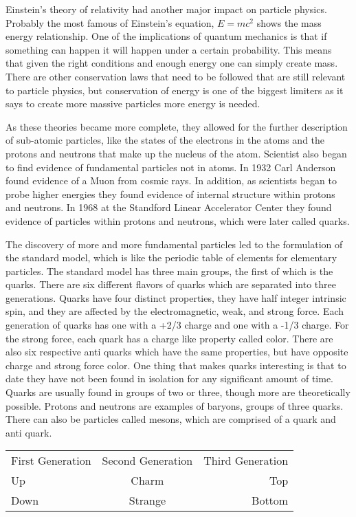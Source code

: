 \documentclass
[]
{thesis}
\begin{document}
Einstein's theory of relativity had another major impact on particle physics. Probably the most famous of Einstein's equation, $E = mc^2$ shows the mass energy relationship. One of the implications of quantum mechanics is that if something can happen it will happen under a certain probability. This means that given the right conditions and enough energy one can simply create mass. There are other conservation laws that need to be followed that are still relevant to particle physics, but conservation of energy is one of the biggest limiters as it says to create more massive particles more energy is needed. 

As these theories became more complete, they allowed for the further description of sub-atomic particles, like the states of the electrons in the atoms and the protons and neutrons that make up the nucleus of the atom. Scientist also began to find evidence of fundamental particles not in atoms. In 1932 Carl Anderson found evidence of a Muon from cosmic rays. In addition, as scientists began to probe higher energies they found evidence of internal structure within protons and neutrons. In 1968 at the Standford Linear Accelerator Center they found evidence of particles within protons and neutrons, which were later called quarks.

The discovery of more and more fundamental particles led to the formulation of the standard model, which is like the periodic table of elements for elementary particles. The standard model has three main groups, the first of which is the quarks. There are six different flavors of quarks which are separated into three generations. Quarks have four distinct properties, they have half integer intrinsic spin, and they are affected by the electromagnetic, weak, and strong force. Each generation of quarks has one with a +2/3 charge and one with a -1/3 charge. For the strong force, each quark has a charge like property called color. There are also six respective anti quarks which have the same properties, but have opposite charge and strong force color. One thing that makes quarks interesting is that to date they have not been found in isolation for any significant amount of time. Quarks are usually found in groups of two or three, though more are theoretically possible. Protons and neutrons are examples of baryons, groups of three quarks. There can also be particles called mesons, which are comprised of a quark and anti quark. 

\begin{center}
\begin{tabular}{l c r}
	First Generation & Second Generation & Third Generation \\
	Up & Charm & Top \\
	Down & Strange & Bottom \\
\end{tabular}
\end{center}
\end{document}
